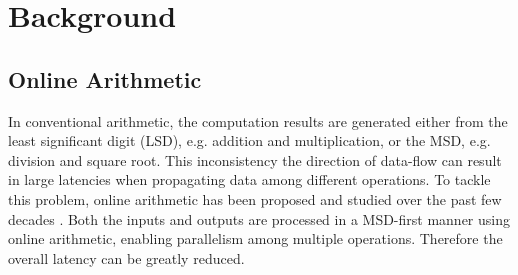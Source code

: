 \documentclass{acm_proc_article-sp}
\begin{document}








\section{Background}
\subsection{Online Arithmetic}
In conventional arithmetic, the computation results are generated either from the least significant digit (LSD), e.g. addition and multiplication, or the MSD, e.g. division and square root. This inconsistency the direction of data-flow can result in large latencies when propagating data among different operations. To tackle this problem, online arithmetic has been proposed and studied over the past few decades \cite{Ercegovac_OnlineOverview,Ercegovac_OnlineMult,Online_Trunc}. Both the inputs and outputs are processed in a MSD-first manner using online arithmetic, enabling parallelism among multiple operations. Therefore the overall latency can be greatly reduced.
\vspace{-1ex}
\end{document}
